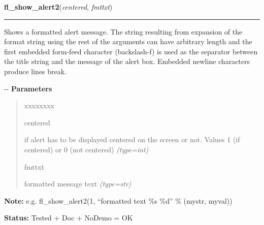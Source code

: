     \vspace{0.5ex}

\hspace{.8\funcindent}\begin{boxedminipage}{\funcwidth}

    \raggedright \textbf{fl\_show\_alert2}(\textit{centered}, \textit{fmttxt})

    \vspace{-1.5ex}

    \rule{\textwidth}{0.5\fboxrule}
\setlength{\parskip}{2ex}

Shows a formatted alert message. The string resulting from expansion
of the format string using the rest of the arguments can have arbitrary
length and the first embedded form-feed character (backslash-f) is used
as the separator between the title string and the message of the alert
box. Embedded newline characters produce lines break.

-{}-
\setlength{\parskip}{1ex}
      \textbf{Parameters}
      \vspace{-1ex}

      \begin{quote}
        \begin{Ventry}{xxxxxxxx}

          \item[centered]


if alert has to be displayed centered on the screen or not. Values 1
(if centered) or 0 (not centered)
            {\it (type=int)}

          \item[fmttxt]


formatted message text
            {\it (type=str)}

        \end{Ventry}

      \end{quote}

\textbf{Note:} 
e.g. fl\_show\_alert2(1, ``formatted text \%s \%d'' \% (mystr, myval))


\textbf{Status:} 
Tested + Doc + NoDemo = OK


    \end{boxedminipage}

    \label{xformslib:flgoodies:fl_hide_alert}

    \vspace{0.5ex}

